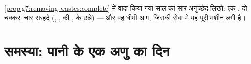 \begin{exercise}[$\star\star\star$]\label{exo:g7:removing-wastes:12}
\cref{prop:g7:removing-wastes:complete} में वादा किया गया साल का
सार-अनुच्छेद लिखो: एक , दो चक्कर, चार सरहदें (, ,
 की ,  के छन्ने) --- और वह धीमी आग, जिसकी सेवा
में यह पूरी मशीन लगी है।
\end{exercise}

\section{समस्या: पानी के एक अणु का दिन}

